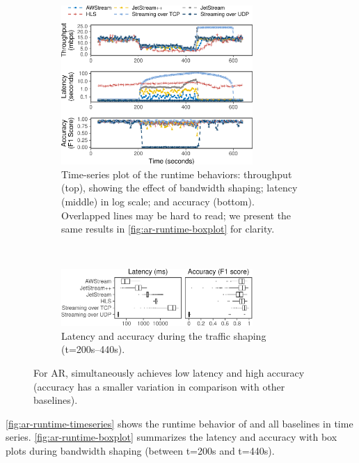 \begin{figure}
  \begin{subfigure}[t]{\textwidth}
    \centering
    \includegraphics[width=0.8\textwidth]{figures/runtime_darknet-timeseries.pdf}
    \caption{Time-series plot of the runtime behaviors: throughput (top),
      showing the effect of bandwidth shaping; latency (middle) in log scale;
      and accuracy (bottom). Overlapped lines may be hard to read; we present
      the same results in \autoref{fig:ar-runtime-boxplot} for clarity.}
    \label{fig:ar-runtime-timeseries}
  \end{subfigure}
  \vspace{2em}
  \\
  \begin{subfigure}[t]{\textwidth}
    \centering
    \includegraphics[width=0.8\textwidth]{figures/runtime_darknet-boxplot.pdf}
    \caption{Latency and accuracy during the traffic shaping (t=200s--440s).}
    \label{fig:ar-runtime-boxplot}
  \end{subfigure}
  \caption{For AR, \awstream{} simultaneously achieves low latency and high
    accuracy (accuracy has a smaller variation in comparison with other
    baselines).}
  \label{fig:ar-runtime}
\end{figure}

 \autoref{fig:ar-runtime-timeseries} shows the runtime behavior
of \awstream{} and all baselines in time series. \autoref{fig:ar-runtime-boxplot}
summarizes the latency and accuracy with box plots during bandwidth shaping
(between t=200s and t=440s).

